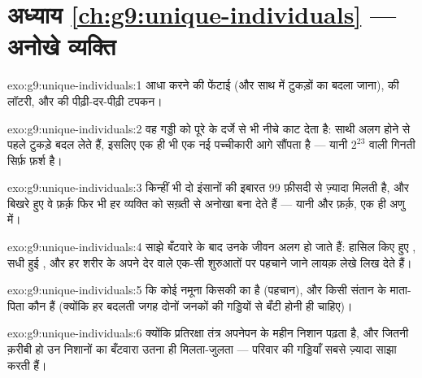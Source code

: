 \section*{अध्याय \ref{ch:g9:unique-individuals} --- अनोखे व्यक्ति}

\begin{solution}{exo:g9:unique-individuals:1}
आधा करने की फेंटाई (और साथ में टुकड़ों का बदला जाना),  की लॉटरी, और
 की पीढ़ी-दर-पीढ़ी टपकन।
\end{solution}

\begin{solution}{exo:g9:unique-individuals:2}
वह गड्डी को पूरे  के दर्जे से भी नीचे काट देता है: साथी अलग
होने से पहले टुकड़े बदल लेते हैं, इसलिए एक ही  भी एक नई पच्चीकारी
आगे सौंपता है --- यानी $2^{23}$ वाली गिनती सिर्फ़ फ़र्श है।
\end{solution}

\begin{solution}{exo:g9:unique-individuals:3}
किन्हीं भी दो इंसानों की  इबारत $99$ फ़ीसदी से ज़्यादा मिलती है, और
बिखरे हुए वे फ़र्क़ फिर भी हर व्यक्ति को सख़्ती से अनोखा बना देते हैं ---
यानी  और फ़र्क़, एक ही अणु में।
\end{solution}

\begin{solution}{exo:g9:unique-individuals:4}
साझे बँटवारे के बाद उनके जीवन अलग हो जाते हैं: हासिल किए हुए , सधी
हुई , और हर शरीर के अपने देर वाले  एक-सी
शुरुआतों पर पहचाने जाने लायक़ लेखे लिख देते हैं।
\end{solution}

\begin{solution}{exo:g9:unique-individuals:5}
कि कोई नमूना किसकी  का है (पहचान), और किसी संतान के माता-पिता कौन
हैं (क्योंकि हर बदलती जगह दोनों जनकों की गड्डियों से बँटी होनी ही
चाहिए)।
\end{solution}

\begin{solution}{exo:g9:unique-individuals:6}
क्योंकि प्रतिरक्षा तंत्र अपनेपन के महीन निशान पढ़ता है, और  जितनी
क़रीबी हो उन निशानों का बँटवारा उतना ही मिलता-जुलता --- परिवार की
गड्डियाँ सबसे ज़्यादा साझा करती हैं।
\end{solution}

